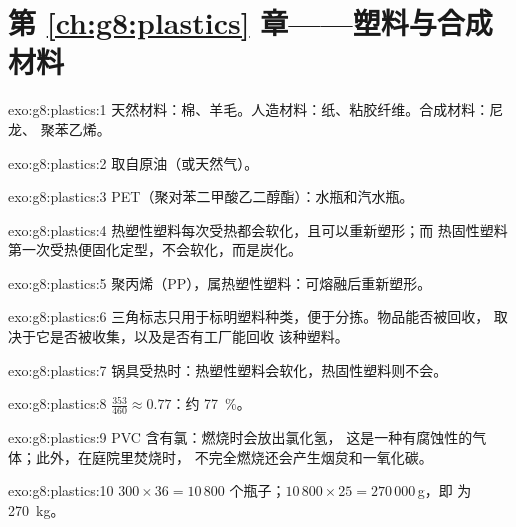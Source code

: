 \section*{第 \ref{ch:g8:plastics} 章——塑料与合成材料}

\begin{solution}{exo:g8:plastics:1}
天然材料：棉、羊毛。人造材料：纸、粘胶纤维。合成材料：尼龙、
聚苯乙烯。
\end{solution}

\begin{solution}{exo:g8:plastics:2}
取自原油（或天然气）。
\end{solution}

\begin{solution}{exo:g8:plastics:3}
PET（聚对苯二甲酸乙二醇酯）：水瓶和汽水瓶。
\end{solution}

\begin{solution}{exo:g8:plastics:4}
热塑性塑料每次受热都会软化，且可以重新塑形；而
热固性塑料第一次受热便固化定型，不会软化，而是炭化。
\end{solution}

\begin{solution}{exo:g8:plastics:5}
聚丙烯（PP），属热塑性塑料：可熔融后重新塑形。
\end{solution}

\begin{solution}{exo:g8:plastics:6}
三角标志只用于标明塑料种类，便于分拣。物品能否被回收，
取决于它是否被收集，以及是否有工厂能回收
该种塑料。
\end{solution}

\begin{solution}{exo:g8:plastics:7}
锅具受热时：热塑性塑料会软化，热固性塑料则不会。
\end{solution}

\begin{solution}{exo:g8:plastics:8}
$\frac{353}{460} \approx 0.77$：约 \qty{77}{\percent}。
\end{solution}

\begin{solution}{exo:g8:plastics:9}
PVC 含有氯：燃烧时会放出氯化氢，
这是一种有腐蚀性的气体；此外，在庭院里焚烧时，
不完全燃烧还会产生烟炱和一氧化碳。
\end{solution}

\begin{solution}{exo:g8:plastics:10}
$300 \times 36 = 10\,800$ 个瓶子；$10\,800 \times 25 = 270\,000$\,g，即
为 \qty{270}{kg}。
\end{solution}

